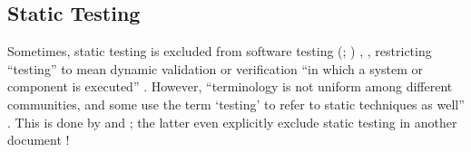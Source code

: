 \subsection{Static Testing}
\label{static-test}
Sometimes, static testing is excluded from software testing
\ifnotpaper
    (\citealp[p.~222]{AmmannAndOffutt2017}; \citealp[p.~13]{Firesmith2015})%
\else
    \cite[p.~222]{AmmannAndOffutt2017}, \cite[p.~13]{Firesmith2015}%
\fi, restricting ``testing'' to mean dynamic validation \citep[p.~5-1]{SWEBOK2024}
or verification ``in which a system or component is
executed'' \citep[p.~427]{IEEE2017}. However, ``terminology is not uniform
among different communities, and some use the term `testing' to refer to
static techniques as well''
\citep[p.~5-2]{SWEBOK2024}. This is done by \citet[pp.~8-9]{Gerrard2000a} and
\citet[p.~17]{IEEE2022}; the latter even explicitly exclude static testing in
another document \citeyearpar[p.~440]{IEEE2017}%
!

\ifnotpaper



